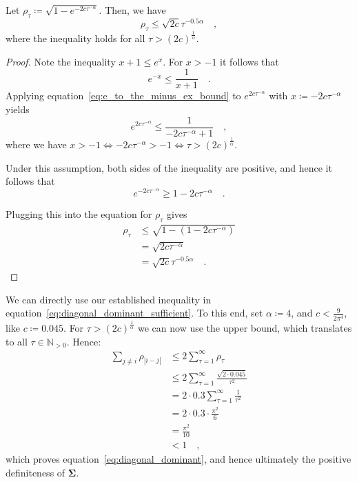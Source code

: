 \documentclass[../../main.tex]{subfiles}
\begin{document}
\begin{lemma}
    Let $\rho_\tau \coloneqq \sqrt{1 - e^{-2c \tau^{-\alpha}}}$. Then, we have
    \[
        \rho_\tau \leq \sqrt{2c} \tau^{-0.5 \alpha} \quad ,
    \]
    where the inequality holds for all $\tau > (2c)^{\frac{1}{\alpha}}$.
\end{lemma}

\begin{proof}
    Note the inequality $x + 1 \leq e^x$. For $x > -1$ it follows that
    \begin{equation}
        e^{-x} \leq \frac{1}{x + 1} \label{eq:e_to_the_minus_ex_bound} \quad .
    \end{equation}
    Applying equation~\ref{eq:e_to_the_minus_ex_bound} to $e^{2c \tau^{-\alpha}}$ with $x \coloneqq -2c \tau^{-\alpha}$ yields
    \[
        e^{2c \tau^{-\alpha}} \leq \frac{1}{-2c \tau^{-\alpha} + 1} \quad ,
    \]
    where we have $x > -1 \iff -2c \tau^{-\alpha} > -1 \iff \tau > (2c)^{\frac{1}{\alpha}}$.

    Under this assumption, both sides of the inequality are positive, and hence it follows that
    \[
        e^{-2c \tau^{-\alpha}} \geq 1 -2c \tau^{-\alpha} \quad .
    \]

    Plugging this into the equation for $\rho_\tau$ gives
    \begin{align*}
        \rho_\tau &\leq \sqrt{1 - (1 -2c \tau^{-\alpha})} \\
        &= \sqrt{2c \tau^{-\alpha}} \\
        &= \sqrt{2c} \tau^{-0.5\alpha} \quad .
    \end{align*}
\end{proof}

We can directly use our established inequality in equation~\eqref{eq:diagonal_dominant_sufficient}. To this end, set $\alpha \coloneqq 4$, and $c < \frac{9}{2 \pi^4}$, like $c \coloneqq 0.045$. For $\tau > (2c)^{\frac{1}{\alpha}}$ we can now use the upper bound, which translates to all $\tau \in \mathbb{N}_{>0}$. Hence:
\begin{align*}
    \sum_{j \neq i} \rho_{|i-j|} &\leq 2 \sum_{\tau = 1}^{\infty} \rho_\tau \\
    &\leq 2 \sum_{\tau = 1}^{\infty} \frac{\sqrt{2 \cdot 0.045}}{\tau^2} \\
    &= 2 \cdot 0.3 \sum_{\tau = 1}^{\infty} \frac{1}{\tau^2} \\
    &= 2 \cdot 0.3 \cdot \frac{\pi^2}{6} \\
    &= \frac{\pi^2}{10} \\
    &< 1 \quad ,
\end{align*}
which proves equation~\eqref{eq:diagonal_dominant}, and hence ultimately the positive definiteness of $\bm{\Sigma}$.
\end{document}
